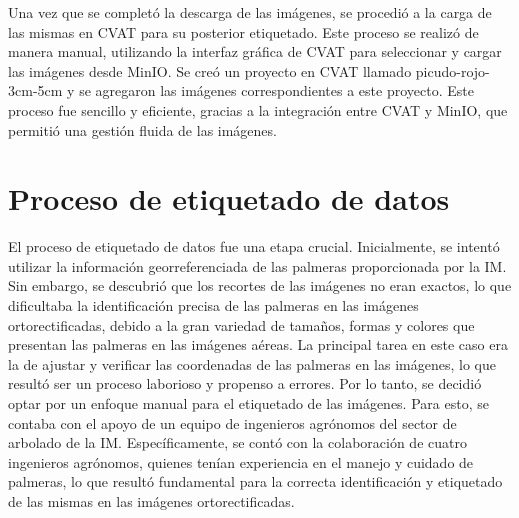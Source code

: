 Una vez que se completó la descarga de las imágenes, se procedió a la carga de las mismas en CVAT para su posterior etiquetado. Este proceso se realizó de manera manual, utilizando la interfaz gráfica de CVAT para seleccionar y cargar las imágenes desde MinIO. Se creó un proyecto en CVAT llamado picudo-rojo-3cm-5cm y se agregaron las imágenes correspondientes a este proyecto. Este proceso fue sencillo y eficiente, gracias a la integración entre CVAT y MinIO, que permitió una gestión fluida de las imágenes.


\section{Proceso de etiquetado de datos}
\label{sec:etiquetado}


El proceso de etiquetado de datos fue una etapa crucial. Inicialmente, se intentó utilizar la información georreferenciada de las palmeras proporcionada por la IM. Sin embargo, se descubrió que los recortes de las imágenes no eran exactos, lo que dificultaba la identificación precisa de las palmeras en las imágenes ortorectificadas, debido a la gran variedad de tamaños, formas y colores que presentan las palmeras en las imágenes aéreas. La principal tarea en este caso era la de ajustar y verificar las coordenadas de las palmeras en las imágenes, lo que resultó ser un proceso laborioso y propenso a errores. Por lo tanto, se decidió optar por un enfoque manual para el etiquetado de las imágenes. Para esto, se contaba con el apoyo de un equipo de ingenieros agrónomos del sector de arbolado de la IM. Específicamente, se contó con la colaboración de cuatro ingenieros agrónomos, quienes tenían experiencia en el manejo y cuidado de palmeras, lo que resultó fundamental para la correcta identificación y etiquetado de las mismas en las imágenes ortorectificadas.

